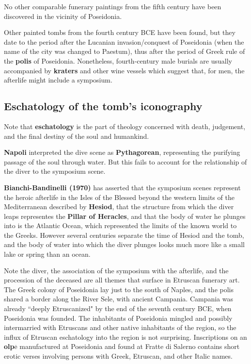 \begin{rmk}
    No other comparable funerary paintings from the fifth century have been discovered in the vicinity of Poseidonia.
\end{rmk}

Other painted tombs from the fourth century BCE have been found, but they date to the period after the Lucanian invasion/conquest of Poseidonia (when the name of the city was changed to Paestum), thus after the period of Greek rule of the \textbf{polis} of Poseidonia. Nonetheless, fourth-century male burials are usually accompanied by \textbf{kraters} and other wine vessels which suggest that, for men, the afterlife might include a symposium.

\subsection{Eschatology of the tomb's iconography}

Note that \textbf{eschatology} is the part of theology concerned with death, judgement, and the final destiny of the soul and humankind. 

\textbf{Napoli} interpreted the dive scene as \textbf{Pythagorean}, representing the purifying passage of the soul through water. But this fails to account for the relationship of the diver to the symposium scene. 

\textbf{Bianchi-Bandinelli (1970)} has asserted that the symposium scenes represent the heroic afterlife in the Isles of the Blessed beyond the western limits of the Mediterranean described by \textbf{Hesiod}, that the structure from which the diver leaps representes the \textbf{Pillar of Heracles}, and that the body of water he plunges into is the Atlantic Ocean, which represented the limits of the known world to the Greeks. However several centuries separate the time of Hesiod and the tomb, and the body of water into which the diver plunges looks much more like a small lake or spring than an ocean.

Note the diver, the association of the symposium with the afterlife, and the procession of the deceased are all themes that surface in Etruscan funerary art. The Greek colony of Poseidonia lay just to the south of Naples, and the polis shared a border along the River Sele, with ancient Campania. Campania was already ``deeply Etruscanized" by the end of the seventh century BCE, when Poseidonia was founded. The inhabitants of Poseidonia mingled and possibly intermarried with Etruscans and other native inhabitants of the region, so the influx of Etruscan eschatology into the region is not surprising. Inscriptions on an \textbf{olp$\overline{\text{e}}$} manufactured at Poseidonia and found at Fratte di Salerno contains short erotic verses involving persons with Greek, Etruscan, and other Italic names.

